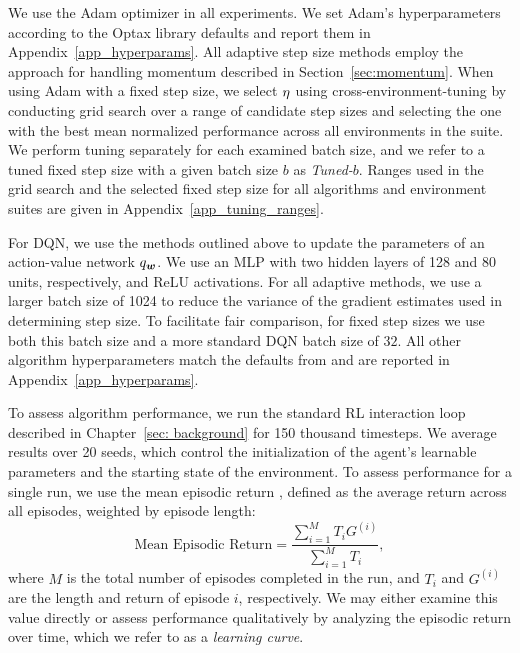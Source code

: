 We use the Adam optimizer in all experiments. We set Adam's hyperparameters according to the Optax library defaults  and report them in Appendix~\ref{app_hyperparams}. All adaptive step size methods employ the approach for handling momentum described in Section~\ref{sec:momentum}. When using Adam with a fixed step size, we select $\eta$ using cross-environment-tuning  by conducting grid search over a range of candidate step sizes and selecting the one with the best mean normalized performance across all environments in the suite. We perform tuning separately for each examined batch size, and we refer to a tuned fixed step size with a given batch size $b$ as \textit{Tuned-$b$}. Ranges used in the grid search and the selected fixed step size for all algorithms and environment suites are given in Appendix~\ref{app_tuning_ranges}.

For DQN, we use the methods outlined above to update the parameters of an action-value network $q_{\bm w}$. We use an MLP with two hidden layers of 128 and 80 units, respectively, and ReLU activations. For all adaptive methods, we use a larger batch size of 1024 to reduce the variance of the gradient estimates used in determining step size. To facilitate fair comparison, for fixed step sizes we use both this batch size and a more standard DQN batch size of $32$. All other algorithm hyperparameters match the defaults from  and are reported in Appendix~\ref{app_hyperparams}. 

To assess algorithm performance, we run the standard RL interaction loop described in Chapter~\ref{sec: background} for 150 thousand timesteps. We average results over 20 seeds, which control the initialization of the agent's learnable parameters and the starting state of the environment. To assess performance for a single run, we use the mean episodic return , defined as the average return across all episodes, weighted by episode length:
\begin{equation}
    \text{Mean Episodic Return} = \frac{\sum_{i=1}^{M} T_i G^{(i)}}{\sum_{i=1}^{M} T_i},
    \label{eq:weighted_performance}
\end{equation}
where $M$ is the total number of episodes completed in the run, and $T_i$ and $G^{(i)}$ are the length and return of episode $i$, respectively. We may either examine this value directly or assess performance qualitatively by analyzing the episodic return over time, which we refer to as a \textit{learning curve}. 

